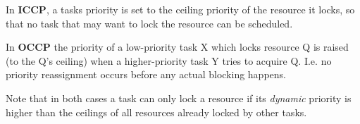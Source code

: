 In \textbf{ICCP}, a tasks priority is set to the ceiling priority of the resource it locks, so that no task that may want to lock the resource can be scheduled.

In \textbf{OCCP} the priority of a low-priority task X which locks resource Q is raised (to the Q's ceiling) when a higher-priority task Y tries to acquire Q. I.e. no priority reassignment occurs before any actual blocking happens. 

Note that in both cases a task can only lock a resource if its \emph{dynamic} priority is higher than the ceilings of all resources already locked by other tasks.
